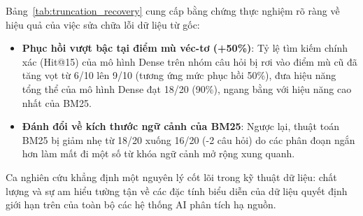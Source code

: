 Bảng~\ref{tab:truncation_recovery} cung cấp bằng chứng thực nghiệm rõ ràng về hiệu quả của việc sửa chữa lỗi dữ liệu từ gốc:
\begin{itemize}
    \item \textbf{Phục hồi vượt bậc tại điểm mù véc-tơ (+50\%)}: Tỷ lệ tìm kiếm chính xác (Hit@15) của mô hình Dense trên nhóm câu hỏi bị rơi vào điểm mù cũ đã tăng vọt từ 6/10 lên 9/10 (tương ứng mức phục hồi 50\%), đưa hiệu năng tổng thể của mô hình Dense đạt 18/20 (90\%), ngang bằng với hiệu năng cao nhất của BM25.
    \item \textbf{Đánh đổi về kích thước ngữ cảnh của BM25}: Ngược lại, thuật toán BM25 bị giảm nhẹ từ 18/20 xuống 16/20 (-2 câu hỏi) do các phân đoạn ngắn hơn làm mất đi một số từ khóa ngữ cảnh mở rộng xung quanh.
\end{itemize}
Ca nghiên cứu khẳng định một nguyên lý cốt lõi trong kỹ thuật dữ liệu: chất lượng và sự am hiểu tường tận về các đặc tính biểu diễn của dữ liệu quyết định giới hạn trên của toàn bộ các hệ thống AI phân tích hạ nguồn.
